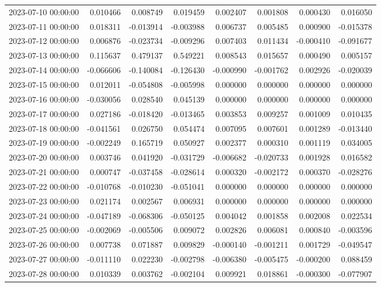 \begin{tabular}{lrrrrrrr}
2023-07-10 00:00:00 & 0.010466 & 0.008749 & 0.019459 & 0.002407 & 0.001808 & 0.000430 & 0.016050 \\
2023-07-11 00:00:00 & 0.018311 & -0.013914 & -0.003988 & 0.006737 & 0.005485 & 0.000900 & -0.015378 \\
2023-07-12 00:00:00 & 0.006876 & -0.023734 & -0.009296 & 0.007403 & 0.011434 & -0.000410 & -0.091677 \\
2023-07-13 00:00:00 & 0.115637 & 0.479137 & 0.549221 & 0.008543 & 0.015657 & 0.000490 & 0.005157 \\
2023-07-14 00:00:00 & -0.066606 & -0.140084 & -0.126430 & -0.000990 & -0.001762 & 0.002926 & -0.020039 \\
2023-07-15 00:00:00 & 0.012011 & -0.054808 & -0.005998 & 0.000000 & 0.000000 & 0.000000 & 0.000000 \\
2023-07-16 00:00:00 & -0.030056 & 0.028540 & 0.045139 & 0.000000 & 0.000000 & 0.000000 & 0.000000 \\
2023-07-17 00:00:00 & 0.027186 & -0.018420 & -0.013465 & 0.003853 & 0.009257 & 0.001009 & 0.010435 \\
2023-07-18 00:00:00 & -0.041561 & 0.026750 & 0.054474 & 0.007095 & 0.007601 & 0.001289 & -0.013440 \\
2023-07-19 00:00:00 & -0.002249 & 0.165719 & 0.050927 & 0.002377 & 0.000310 & 0.001119 & 0.034005 \\
2023-07-20 00:00:00 & 0.003746 & 0.041920 & -0.031729 & -0.006682 & -0.020733 & 0.001928 & 0.016582 \\
2023-07-21 00:00:00 & 0.000747 & -0.037458 & -0.028614 & 0.000320 & -0.002172 & 0.000370 & -0.028276 \\
2023-07-22 00:00:00 & -0.010768 & -0.010230 & -0.051041 & 0.000000 & 0.000000 & 0.000000 & 0.000000 \\
2023-07-23 00:00:00 & 0.021174 & 0.002567 & 0.006931 & 0.000000 & 0.000000 & 0.000000 & 0.000000 \\
2023-07-24 00:00:00 & -0.047189 & -0.068306 & -0.050125 & 0.004042 & 0.001858 & 0.002008 & 0.022534 \\
2023-07-25 00:00:00 & -0.002069 & -0.005506 & 0.009072 & 0.002826 & 0.006081 & 0.000840 & -0.003596 \\
2023-07-26 00:00:00 & 0.007738 & 0.071887 & 0.009829 & -0.000140 & -0.001211 & 0.001729 & -0.049547 \\
2023-07-27 00:00:00 & -0.011110 & 0.022230 & -0.002798 & -0.006380 & -0.005475 & -0.000200 & 0.088459 \\
2023-07-28 00:00:00 & 0.010339 & 0.003762 & -0.002104 & 0.009921 & 0.018861 & -0.000300 & -0.077907 \\

\end{tabular}
